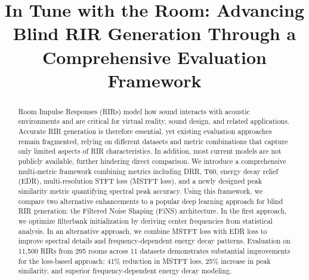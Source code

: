 \documentclass[conference]{IEEEtran}
\begin{document}
\title{In Tune with the Room: Advancing Blind RIR Generation
Through a Comprehensive Evaluation Framework}

\author{
}
\maketitle

\begin{abstract}
Room Impulse Responses (RIRs) model how sound interacts with acoustic environments and are critical for virtual reality, sound design, and related applications. Accurate RIR generation is therefore essential, yet existing evaluation approaches remain fragmented, relying on different datasets and metric combinations that capture only limited aspects of RIR characteristics. In addition, most current models are not publicly available, further hindering direct comparison. We introduce a comprehensive multi-metric framework combining metrics including DRR, T60, energy decay relief (EDR), multi-resolution STFT loss (MSTFT loss), and a newly designed peak similarity metric quantifying spectral peak accuracy. Using this framework, we compare two alternative enhancements to a popular deep learning approach for blind RIR generation: the Filtered Noise Shaping (FiNS) architecture. In the first approach, we optimize filterbank initialization by deriving center frequencies from statistical analysis. In an alternative approach, we combine MSTFT loss with EDR loss to improve spectral details and frequency-dependent energy decay patterns. Evaluation on 11,500 RIRs from 295 rooms across 11 datasets demonstrates substantial improvements for the loss-based approach: 41\% reduction in MSTFT loss, 25\% increase in peak similarity, and superior frequency-dependent energy decay modeling.
\end{abstract}
 
\end{document}
